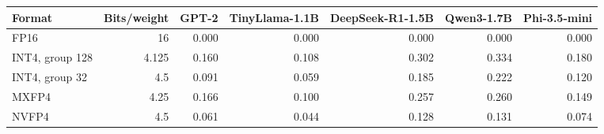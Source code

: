 \begin{tabular}{lrrrrrr}
\toprule
Format & Bits/weight & GPT-2 & TinyLlama-1.1B & DeepSeek-R1-1.5B & Qwen3-1.7B & Phi-3.5-mini \\
\midrule
FP16 & 16 & 0.000 & 0.000 & 0.000 & 0.000 & 0.000 \\
INT4, group 128 & 4.125 & 0.160 & 0.108 & 0.302 & 0.334 & 0.180 \\
INT4, group 32 & 4.5 & 0.091 & 0.059 & 0.185 & 0.222 & 0.120 \\
MXFP4 & 4.25 & 0.166 & 0.100 & 0.257 & 0.260 & 0.149 \\
NVFP4 & 4.5 & 0.061 & 0.044 & 0.128 & 0.131 & 0.074 \\
\bottomrule
\end{tabular}
